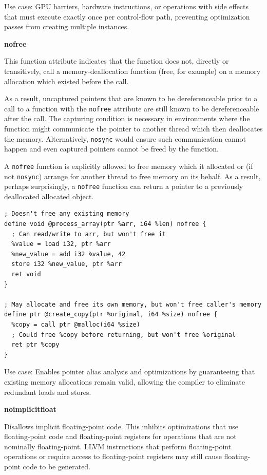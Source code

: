 Use case: GPU barriers, hardware instructions, or operations with side effects that must execute exactly once per control-flow path, preventing optimization passes from creating multiple instances.

\textbf{nofree}

This function attribute indicates that the function does not, directly or transitively, call a memory-deallocation function (free, for example) on a memory allocation which existed before the call.

As a result, uncaptured pointers that are known to be dereferenceable prior to a call to a function with the \texttt{nofree} attribute are still known to be dereferenceable after the call.
The capturing condition is necessary in environments where the function might communicate the pointer to another thread which then deallocates the memory.
Alternatively, \texttt{nosync} would ensure such communication cannot happen and even captured pointers cannot be freed by the function.

A \texttt{nofree} function is explicitly allowed to free memory which it allocated or (if not \texttt{nosync}) arrange for another thread to free memory on its behalf.
As a result, perhaps surprisingly, a \texttt{nofree} function can return a pointer to a previously deallocated allocated object.

\begin{lstlisting}[style=ir]
; Doesn't free any existing memory
define void @process_array(ptr %arr, i64 %len) nofree {
  ; Can read/write to arr, but won't free it
  %value = load i32, ptr %arr
  %new_value = add i32 %value, 42
  store i32 %new_value, ptr %arr
  ret void
}

; May allocate and free its own memory, but won't free caller's memory
define ptr @create_copy(ptr %original, i64 %size) nofree {
  %copy = call ptr @malloc(i64 %size)
  ; Could free %copy before returning, but won't free %original
  ret ptr %copy
}
\end{lstlisting}

Use case: Enables pointer alias analysis and optimizations by guaranteeing that existing memory allocations remain valid, allowing the compiler to eliminate redundant loads and stores.

\textbf{noimplicitfloat}

Disallows implicit floating-point code.
This inhibits optimizations that use floating-point code and floating-point registers for operations that are not nominally floating-point.
LLVM instructions that perform floating-point operations or require access to floating-point registers may still cause floating-point code to be generated.

